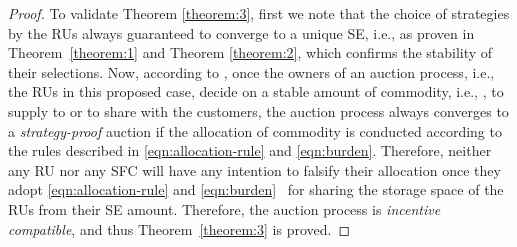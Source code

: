 \documentclass[journal,10pt]{IEEEtran}
\begin{document}
\begin{proof}
To validate Theorem \ref{theorem:3}, first we note that the choice of strategies by the RUs always guaranteed to converge to a unique SE, i.e.,  as proven in Theorem~\ref{theorem:1} and Theorem \ref{theorem:2}, which confirms the stability of their selections. Now, according to \cite{Huang-doubleauction:2002}, once the owners of an auction process, i.e., the RUs in this proposed case, decide on a stable amount of commodity, i.e., , to supply to or to share with the customers, the auction process always converges to a \emph{strategy-proof} auction if the allocation of commodity is conducted according to the rules described in \eqref{eqn:allocation-rule} and \eqref{eqn:burden}.  Therefore, neither any RU nor any SFC will have any intention to falsify their allocation once they adopt \eqref{eqn:allocation-rule} and \eqref{eqn:burden}~\cite{Huang-doubleauction:2002} for sharing the storage space of the RUs from their SE amount. Therefore, the auction process is \emph{incentive compatible}, and thus Theorem~\ref{theorem:3} is proved.
\end{proof}
\end{document}
